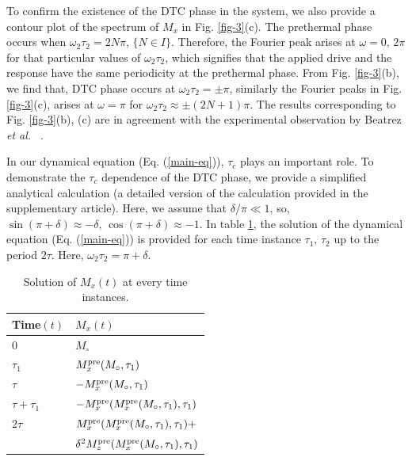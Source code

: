 \documentclass[prl,aps,twocolumn,floatfix]{revtex4-1}
\newcommand{\etal}{\textit{et al.\ }}
\begin{document}
 To confirm the existence of the DTC phase in the system, we also provide a contour plot of the spectrum of
$M_x$ in Fig. \ref{fig-3}(c).  The prethermal phase occurs when $\omega_2\tau_2 = 2N \pi$, $\{N \in I\}$.
Therefore, the Fourier peak arises at $ \omega = 0, \, 2\pi$ for that particular values of $\omega_2
\tau_2$, which signifies that the applied drive and the response have the same periodicity at the prethermal
phase. From Fig. \ref{fig-3}(b), we find that, DTC phase occurs at $\omega_2 \tau_2 = \pm \pi$, similarly
the Fourier peaks in Fig. \ref{fig-3}(c), arises at $\omega =  \pi$ for $\omega_2 \tau_2 \approx \pm (2N +1)
\pi$.  The results corresponding to Fig.
\ref{fig-3}(b), (c) are in agreement with the experimental observation by Beatrez \etal
\citep{beatrez_critical_2023}. 

In our dynamical equation (Eq. (\ref{main-eq})), $\tau_c$ plays an important role. To demonstrate the
$\tau_c$ dependence of the DTC phase, we provide a simplified analytical calculation (a detailed version 
of the calculation provided in the supplementary article). Here, we assume that
$\delta/ \pi \ll 1 $, so, $\sin(\pi +\delta) \approx -\delta, \, \cos(\pi +\delta)  \approx -1$. In table
\ref{table-1}, the solution of the dynamical equation (Eq. (\ref{main-eq})) is provided for each time
instance $\tau_1, \, \tau_2$ up to the period $2\tau$. Here, $\omega_2 \tau_2 = \pi + \delta$.
\begin{table}[htb]
\begin{center}
\caption{Solution of $M_x (t)$ at every time instances.}
\begin{tabular}{ p{1.5cm} |p{4.5cm}    }
 Time$(t)$& $M_x (t)$\\
 \hline
 \hline
 $0$ & $M_{\circ}$\\
 $\tau_1$  &  $M_x^{\scriptstyle \rm pre}(M_\circ,\tau_1)$    \\
 $\tau $  & $-M_x^{\scriptstyle \rm pre}(M_\circ,\tau_1)$     \\
 $\tau + \tau_1$  &  $-M_x^{\scriptstyle \rm pre}(M_x^{\scriptstyle \rm pre}(M_{\circ}, \tau_1), \tau_1)$    \\
 $2\tau$  &  $ M_x^{\scriptstyle \rm pre}(M_x^{\scriptstyle \rm pre}(M_{\circ}, \tau_1), \tau_1) +$    \\
 &   $\delta^2 M_z^{\scriptstyle \rm pre}(M_x^{\scriptstyle \rm pre}(M_{\circ}, \tau_1), \tau_1)$ \\
 \hline
  \end{tabular}
\label{table-1}
\end{center}
\end{table} 
\end{document}
